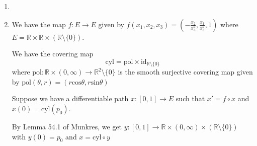 \documentclass{article}
\begin{document}
\begin{enumerate}
        \begin{enumerate}
        
        \item This is the same as the previous problem, with a particular initial value.

        \item 
        
        \begin{itemize}
            
            \item Define $x:(-1,1) \to E=(\mathbb{R}\setminus\{0\}) \times \mathbb{R}$ by $x(t)=(\sqrt{1+t},\frac{1}{1-t})$

            \item The interval cannot be extended beyond $1$ because $x(t)$ is unbounded near $1$

            \item The interval cannot be extended beyond $-1$ because \\ $\text{lim}_{t \to -1^+}x(t)=(0,\frac{1}{2}) \notin E$ 
        
        \end{itemize}

        \item Define $x:(-1,\infty) \to E=(\mathbb{R}\setminus\{0\}) \times \mathbb{R}$ by \\$x(t)=(\sqrt{1+t},\frac{2}{3}\sqrt{1+t}(1+t)+\frac{1}{3}$. This cannot be extended beyond $-1$ because $\text{lim}_{t \to -1^+}x(t)=(0,\frac{1}{3}) \notin E$
        
        \end{enumerate}

    \item 

    \item We have the map $f:E \to E$ given by $f(x_1,x_2,x_3)=(-\frac{x_2}{x_3^2},\frac{x_1}{x_3^2},1)$ where $E=  \mathbb{R} \times \mathbb{R} \times (\mathbb{R} \setminus \{0\})$.
    
      We have the covering map \[\text{cyl}=\text{pol} \times \text{id}_{\mathbb{R} \setminus \{0\}}\] where 
      $\text{pol}:\mathbb{R} \times (0,\infty) \to \mathbb{R}^2 \setminus \{0\}$ 
      is the smooth surjective covering map given by $\text{pol}(\theta,r)=(r\text{cos}\theta,r\text{sin}\theta)$

    Suppose we have a differentiable path $x:[0,1] \to E$ such that $x'=f \circ x$ and $x(0)=\text{cyl}(p_0)$.
    
       By Lemma 54.1 of Munkres, we get $y:[0,1] \to \mathbb{R} \times (0,\infty) \times (\mathbb{R}\setminus \{0\})$ with $y(0)=p_0$ and $x=\text{cyl} \circ y$
    \end{enumerate}
\end{document}
